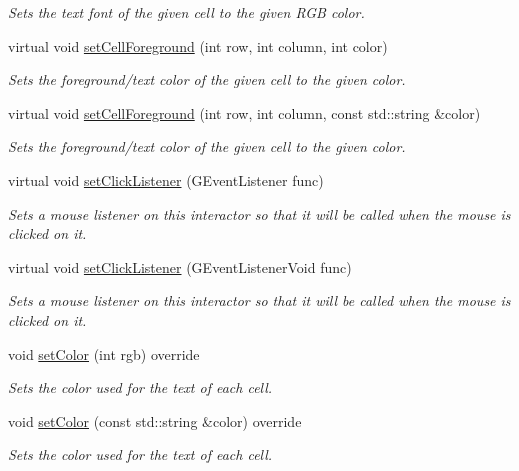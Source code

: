 \begin{DoxyCompactItemize}
\begin{DoxyCompactList}\small\item\em Sets the text font of the given cell to the given R\+GB color. \end{DoxyCompactList}\item 
virtual void \mbox{\hyperlink{classGTable_a19969b2f2b0cbf219333b02c047b2e7e}{set\+Cell\+Foreground}} (int row, int column, int color)
\begin{DoxyCompactList}\small\item\em Sets the foreground/text color of the given cell to the given color. \end{DoxyCompactList}\item 
virtual void \mbox{\hyperlink{classGTable_ab0bdc2afa7ef003fa5e8ab6eb25a7282}{set\+Cell\+Foreground}} (int row, int column, const std\+::string \&color)
\begin{DoxyCompactList}\small\item\em Sets the foreground/text color of the given cell to the given color. \end{DoxyCompactList}\item 
virtual void \mbox{\hyperlink{classGInteractor_abd40af6921242584d0954f173911b190}{set\+Click\+Listener}} (G\+Event\+Listener func)
\begin{DoxyCompactList}\small\item\em Sets a mouse listener on this interactor so that it will be called when the mouse is clicked on it. \end{DoxyCompactList}\item 
virtual void \mbox{\hyperlink{classGInteractor_a856414c92df90f56f3877475eb3f8fc4}{set\+Click\+Listener}} (G\+Event\+Listener\+Void func)
\begin{DoxyCompactList}\small\item\em Sets a mouse listener on this interactor so that it will be called when the mouse is clicked on it. \end{DoxyCompactList}\item 
void \mbox{\hyperlink{classGTable_a165735fb49fa7db12602d32557cbfe0d}{set\+Color}} (int rgb) override
\begin{DoxyCompactList}\small\item\em Sets the color used for the text of each cell. \end{DoxyCompactList}\item 
void \mbox{\hyperlink{classGTable_a56845b1accc47aa881d05939eef6996c}{set\+Color}} (const std\+::string \&color) override
\begin{DoxyCompactList}\small\item\em Sets the color used for the text of each cell. \end{DoxyCompactList}\item 

\end{DoxyCompactItemize}
